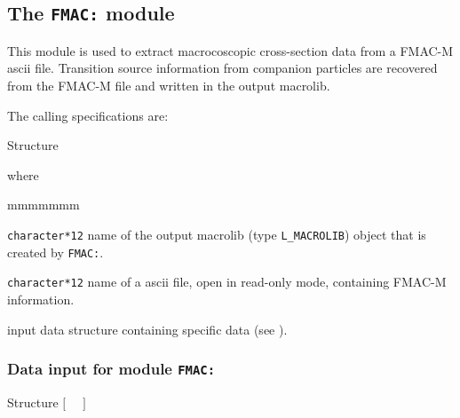 \subsection{The {\tt FMAC:} module}\label{sect:FMACData}

This module is used to extract macrocoscopic cross-section data from a FMAC-M {\sc ascii} file.
Transition source information from companion particles are recovered from the FMAC-M file and written in the
output {\sc macrolib}.

\vskip 0.02cm

The calling specifications are:

\begin{DataStructure}{Structure }
~\moc{:=}~~~\moc{::}~ \\
\end{DataStructure}

\noindent where
\begin{ListeDeDescription}{mmmmmmm}

\item[\dusa{MACRO}] {\tt character*12} name of the output {\sc macrolib} (type {\tt L\_MACROLIB}) object that is created by {\tt FMAC:}.

\item[\dusa{fmac.txt}] {\tt character*12} name of a {\sc ascii} file, open in read-only mode, containing FMAC-M information.

\item[\dusa{FMAC\_data}] input data structure containing specific data (see ).

\end{ListeDeDescription}

\subsubsection{Data input for module {\tt FMAC:}}\label{sect:descFMAC}

\vskip -0.5cm

\begin{DataStructure}{Structure }
$[$~ ~$]$ \\
  \\
\moc{;}
\end{DataStructure}

